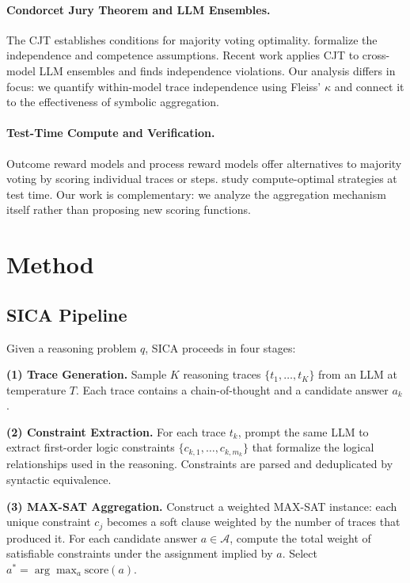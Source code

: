 \documentclass[11pt,a4paper]{article}
\begin{document}
\paragraph{Condorcet Jury Theorem and LLM Ensembles.}
The CJT \citep{condorcet1785} establishes conditions for majority voting optimality. \citet{austensmith1996} formalize the independence and competence assumptions. Recent work \citep{llmcjt2024} applies CJT to cross-model LLM ensembles and finds independence violations. Our analysis differs in focus: we quantify within-model trace independence using Fleiss' $\kappa$ and connect it to the effectiveness of symbolic aggregation.

\paragraph{Test-Time Compute and Verification.}
Outcome reward models \citep{cobbe2021orms} and process reward models \citep{lightman2023prm} offer alternatives to majority voting by scoring individual traces or steps. \citet{snell2025scaling} study compute-optimal strategies at test time. Our work is complementary: we analyze the aggregation mechanism itself rather than proposing new scoring functions.


\section{Method}
\label{sec:method}

\subsection{SICA Pipeline}
\label{sec:sica}

Given a reasoning problem $q$, SICA proceeds in four stages:

\textbf{(1) Trace Generation.} Sample $K$ reasoning traces $\{t_1, \ldots, t_K\}$ from an LLM at temperature $T$. Each trace contains a chain-of-thought and a candidate answer $a_k$.

\textbf{(2) Constraint Extraction.} For each trace $t_k$, prompt the same LLM to extract first-order logic constraints $\{c_{k,1}, \ldots, c_{k,m_k}\}$ that formalize the logical relationships used in the reasoning. Constraints are parsed and deduplicated by syntactic equivalence.

\textbf{(3) MAX-SAT Aggregation.} Construct a weighted MAX-SAT instance: each unique constraint $c_j$ becomes a soft clause weighted by the number of traces that produced it. For each candidate answer $a \in \mathcal{A}$, compute the total weight of satisfiable constraints under the assignment implied by $a$. Select $a^* = \arg\max_a \text{score}(a)$.
\end{document}
